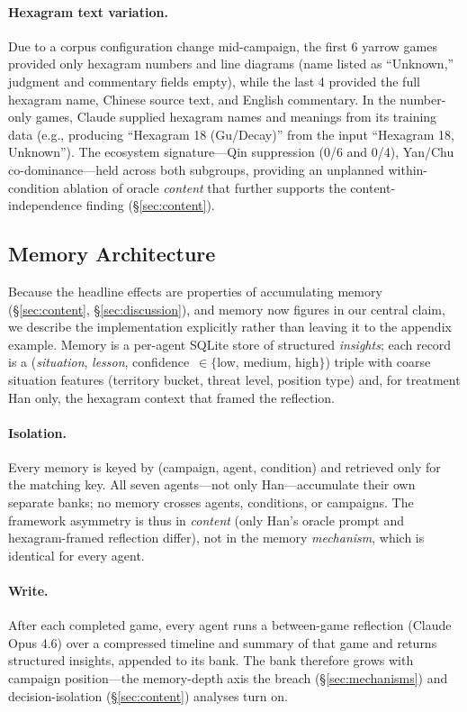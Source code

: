 \documentclass[11pt]{article}
\begin{document}
\paragraph{Hexagram text variation.} Due to a corpus configuration change mid-campaign, the first 6 yarrow games provided only hexagram numbers and line diagrams (name listed as ``Unknown,'' judgment and commentary fields empty), while the last 4 provided the full hexagram name, Chinese source text, and English commentary. In the number-only games, Claude supplied hexagram names and meanings from its training data (e.g., producing ``Hexagram 18 (Gu/Decay)'' from the input ``Hexagram 18, Unknown''). The ecosystem signature---Qin suppression (0/6 and 0/4), Yan/Chu co-dominance---held across both subgroups, providing an unplanned within-condition ablation of oracle \emph{content} that further supports the content-independence finding (\S\ref{sec:content}).

\subsection{Memory Architecture}
\label{sec:memory}

Because the headline effects are properties of accumulating memory (\S\ref{sec:content}, \S\ref{sec:discussion}), and memory now figures in our central claim, we describe the implementation explicitly rather than leaving it to the appendix example. Memory is a per-agent SQLite store of structured \emph{insights}; each record is a (\emph{situation}, \emph{lesson}, confidence~$\in\{$low, medium, high$\}$) triple with coarse situation features (territory bucket, threat level, position type) and, for treatment Han only, the hexagram context that framed the reflection.

\paragraph{Isolation.} Every memory is keyed by (campaign, agent, condition) and retrieved only for the matching key. All seven agents---not only Han---accumulate their own separate banks; no memory crosses agents, conditions, or campaigns. The framework asymmetry is thus in \emph{content} (only Han's oracle prompt and hexagram-framed reflection differ), not in the memory \emph{mechanism}, which is identical for every agent.

\paragraph{Write.} After each completed game, every agent runs a between-game reflection (Claude Opus 4.6) over a compressed timeline and summary of that game and returns structured insights, appended to its bank. The bank therefore grows with campaign position---the memory-depth axis the breach (\S\ref{sec:mechanisms}) and decision-isolation (\S\ref{sec:content}) analyses turn on.
\end{document}
